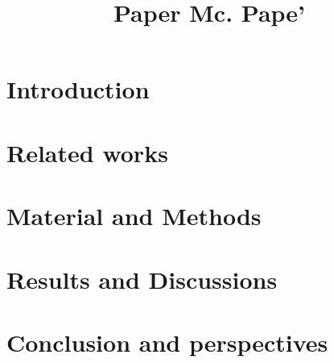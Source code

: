 \documentclass[10pt, a4]{article}
\begin{document}
\newcommand\tim[2]{{\color{red}#1}{\vphantom{#2}}}
\newcommand\alien[2]{{\color{blue}#1}{\vphantom{#2}}}
\newcommand\peter[2]{{\color{green}#1}{\vphantom{#2}}}

\title{Paper Mc. Pape'}

\author{}

\maketitle

\begin{abstract}

\end{abstract}

\section{Introduction}

\section{Related works}

\section{Material and Methods}

\section{Results and Discussions}


\section{Conclusion and perspectives}


{\small



}
\end{document}
